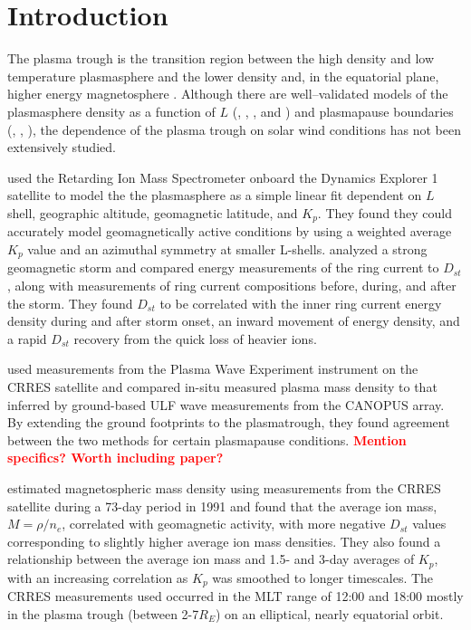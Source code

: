 \documentclass[10pt,twocolumn]{article}
\newcommand{\vinote}[1]{\textcolor{red}{\textbf{#1}}} %
\newcommand{\inote}[1]{\textcolor{blue}{\textbf{#1}}} %
\def\note#1\par{\textcolor{blue}{\textbf{#1}}\\}
\begin{document}
\saythanks

\section{Introduction}

The plasma trough is the transition region between the high density and low temperature plasmasphere and the lower density and, in the equatorial plane, higher energy magnetosphere \citep{Mayr1968ModelMagnetosphereTemperature}.  Although there are well--validated models of the plasmasphere density as a function of $L$ (\cite{Gallagher1988EmpiricalModelPlasmasphere}, \cite{LemaireEarthsPlasmasphere}, \cite{Takahashi2006}, and \cite{Takahashi2010}) and plasmapause boundaries (\cite{LemaireEarthsPlasmasphere}, \cite{Moldwin2002ModelPlasmapause}, \cite{OBrien2003EmpiricalPlasmapause}), the dependence of the plasma trough on solar wind conditions has not been extensively studied.

\cite{Gallagher1988EmpiricalModelPlasmasphere} used the Retarding Ion Mass Spectrometer onboard the Dynamics Explorer 1 satellite to model the the plasmasphere as a simple linear fit dependent on $L$ shell, geographic altitude, geomagnetic latitude, and $K_p$.  They found they could accurately model geomagnetically active conditions by using a weighted average $K_p$ value and an azimuthal symmetry at smaller L-shells.  \cite{Hamilton1988RingCurrentDevelopment} analyzed a strong geomagnetic storm and compared energy measurements of the ring current to $D_{st}$, along with measurements of ring current compositions before, during, and after the storm. They found $D_{st}$ to be correlated with the inner ring current energy density during and after storm onset, an inward movement of energy density, and a rapid $D_{st}$ recovery from the quick loss of heavier ions.

\cite{Lotoaniu1999PlasmaMassDensity} used measurements from the Plasma Wave Experiment instrument on the CRRES satellite and compared in-situ measured plasma mass density to that inferred by ground-based ULF wave measurements from the CANOPUS array. By extending the ground footprints to the plasmatrough, they found agreement between the two methods for certain plasmapause conditions.  \vinote{Mention specifics? Worth including paper?}

\cite{Takahashi2006} estimated magnetospheric mass density using measurements from the CRRES satellite during a 73-day period in 1991 and found that the average ion mass, $M=\rho/n_e$, correlated with geomagnetic activity, with more negative $D_{st}$ values corresponding to slightly higher average ion mass densities.  They also found a relationship between the average ion mass and 1.5- and 3-day averages of $K_p$, with an increasing correlation as $K_p$ was smoothed to longer timescales.  The CRRES measurements used occurred in the MLT range of 12:00 and 18:00 mostly in the plasma trough (between 2-7$R_E$) on an elliptical, nearly equatorial orbit.
\end{document}
